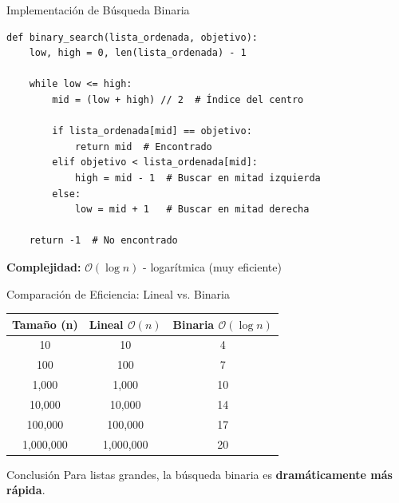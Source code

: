 \documentclass[10pt]{beamer}
\begin{document}
\begin{frame}[fragile]{Implementación de Búsqueda Binaria}
\begin{verbatim}
def binary_search(lista_ordenada, objetivo):
    low, high = 0, len(lista_ordenada) - 1
    
    while low <= high:
        mid = (low + high) // 2  # Índice del centro
        
        if lista_ordenada[mid] == objetivo:
            return mid  # Encontrado
        elif objetivo < lista_ordenada[mid]:
            high = mid - 1  # Buscar en mitad izquierda
        else:
            low = mid + 1   # Buscar en mitad derecha
    
    return -1  # No encontrado
\end{verbatim}

\textbf{Complejidad:} $\mathcal{O}(\log n)$ - logarítmica (muy eficiente)
\end{frame}

\begin{frame}{Comparación de Eficiencia: Lineal vs. Binaria}
  \begin{center}
    \begin{tabular}{|c|c|c|}
      \hline
      \textbf{Tamaño (n)} & \textbf{Lineal} $\mathcal{O}(n)$ & \textbf{Binaria} $\mathcal{O}(\log n)$ \\
      \hline
      10 & 10 & 4 \\
      100 & 100 & 7 \\
      1,000 & 1,000 & 10 \\
      10,000 & 10,000 & 14 \\
      100,000 & 100,000 & 17 \\
      1,000,000 & 1,000,000 & 20 \\
      \hline
    \end{tabular}
  \end{center}
  
  \vspace{0.3cm}
  \begin{alertblock}{Conclusión}
    Para listas grandes, la búsqueda binaria es \textbf{dramáticamente más rápida}.
  \end{alertblock}
\end{frame}
\end{document}
